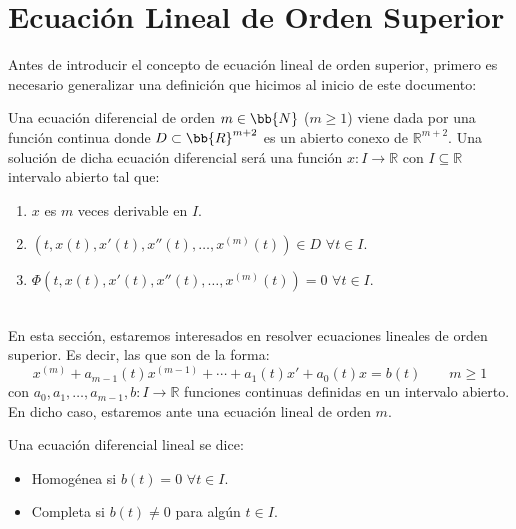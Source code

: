\newpage
\chapter{Ecuación Lineal de Orden Superior}
Antes de introducir el concepto de ecuación lineal de orden superior, primero es necesario generalizar una definición que hicimos al inicio de este documento:
\begin{definicion}
    Una ecuación diferencial de orden $m\in \bb{N}$ ($m\geq 1$) viene dada por una función
    continua donde $D\subset \bb{R}^{m+2}$ es un abierto conexo de $\mathbb{R}^{m+2}$.\newline
    Una solución de dicha ecuación diferencial será una función $x:I\rightarrow\mathbb{R}$ con $I\subseteq \mathbb{R}$ intervalo abierto tal que:
    \begin{enumerate}[label=(\roman*)]
        \item $x$ es $m$ veces derivable en $I$.
        \item $(t,x(t),x'(t),x''(t), \ldots, x^{(m)}(t))\in D$ $\forall t\in I$.
        \item $\Phi(t,x(t),x'(t),x''(t),\ldots,x^{(m)}(t)) = 0$ $\forall t\in I$.
    \end{enumerate}
\end{definicion}~\\

\noindent
En esta sección, estaremos interesados en resolver ecuaciones lineales de orden superior. Es decir, las que son de la forma:
\begin{equation}\label{eq:linealsup}
    x^{(m)} + a_{m-1}(t) x^{(m-1)} + \cdots + a_1(t) x' + a_0(t)x = b(t) \qquad m\geq 1
\end{equation}
con $a_0,a_1,\ldots, a_{m-1},b:I\rightarrow\mathbb{R}$ funciones continuas definidas en un intervalo abierto.\\

\noindent
En dicho caso, estaremos ante una ecuación lineal de orden $m$.

\begin{definicion}
    Una ecuación diferencial lineal se dice: 
    \begin{itemize}
        \item Homogénea si $b(t) = 0$ $\forall t\in I$.
        \item Completa si $b(t) \neq 0$ para algún $t\in I$.
    \end{itemize}
\end{definicion}

